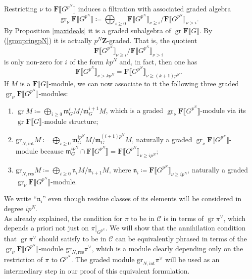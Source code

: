 \documentclass[11pt, oneside]{article}
\newcommand{\gres}{\text{gr}_{N,\text{res}}}
\newcommand{\grint}{\text{gr}_{N,\text{int}}}
\DeclareMathOperator{\gr}{gr}
\theoremstyle{definition}
\begin{document}
	Restricting $\nu$ to $\mathbf F\llbracket G^{p^N}\rrbracket$ induces a filtration with associated graded algebra $$\gr_\nu\mathbf F\llbracket G^{p^N}\rrbracket\coloneqq\bigoplus_{i\geq0}\mathbf F\llbracket G^{p^N}\rrbracket_{\nu\geq i}/\mathbf F\llbracket G^{p^N}\rrbracket_{\nu>i}.$$
	By Proposition \ref{maxideals} it is a graded subalgebra of $\gr\mathbf F\llbracket G\rrbracket$. By (\ref{groupringpN}) it is actually $p^N\mathbf Z$-graded. That is, the quotient $$\mathbf F\llbracket G^{p^N}\rrbracket_{\nu\geq i}/\mathbf F\llbracket G^{p^N}\rrbracket_{\nu>i}$$ is only non-zero for $i$ of the form $kp^N$ and, in fact, then  one has $$\mathbf F\llbracket G^{p^N}\rrbracket_{\nu>kp^N}=\mathbf F\llbracket G^{p^N}\rrbracket_{\nu\geq(k+1)p^N}.$$
	If $M$ is a $\mathbf F\llbracket G\rrbracket$-module, we can now associate to it the following three graded $\gr_\nu\mathbf F\llbracket G^{p^N}\rrbracket$-modules:
	\begin{enumerate}[label=\alph*)]
		\item $\gr M\coloneqq\bigoplus_{i\geq0}\mathfrak m_G^iM/\mathfrak m_G^{i+1}M$, which is a graded $\gr_\nu\mathbf F\llbracket G^{p^N}\rrbracket$-module via its $\gr\mathbf F\llbracket G\rrbracket$-module structure;
		\item $\grint M\coloneqq\bigoplus_{i\geq0}\mathfrak m_G^{ip^N}M/\mathfrak m_G^{(i+1)p^N}M$, naturally a graded $\gr_\nu\mathbf F\llbracket G^{p^N}\rrbracket$-module because $\mathfrak m_G^{ip^N}\cap\mathbf F\llbracket G^{p^N}\rrbracket=\mathbf F\llbracket G^{p^N}\rrbracket_{\nu\geq ip^N}$;
		\item $\gres M\coloneqq\bigoplus_{i\geq0}\mathfrak n_iM/\mathfrak n_{i+1}M$, where $\mathfrak n_i\coloneqq\mathbf F\llbracket G^{p^N}\rrbracket_{\nu\geq ip^N}$, naturally a graded $\gr_\nu\mathbf F\llbracket G^{p^N}\rrbracket$-module.
	\end{enumerate}
	We write ``$\mathfrak n_i$'' even though residue classes of its elements will be considered in degree $ip^N$.\\
	
	As already explained, the condition for $\pi$ to be in $\mathcal C$ is in terms of $\gr\pi^\vee$, which depends a priori not just on $\pi|_{G^{p^N}}$. We will show that the annihilation condition that $\gr\pi^\vee$ should satisfy to be in $\mathcal C$ can be equivalently phrased in terms of the $\gr_\nu\mathbf F\llbracket G^{p^N}\rrbracket$-module $\gres\pi^\vee$, which is a module clearly depending only on the restriction of $\pi$ to $G^{p^N}$. The graded module $\grint\pi^\vee$ will be used as an intermediary step in our proof of this equivalent formulation.
\end{document}
